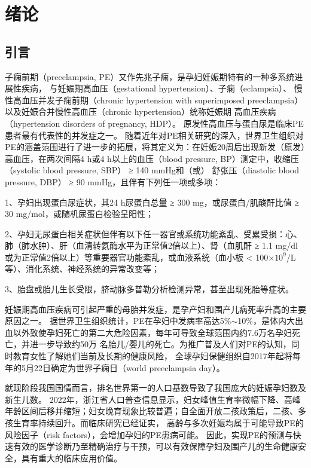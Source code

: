 \chapter{绪论}

\section{引言}
子痫前期（preeclampsia, PE）又作先兆子痫，是孕妇妊娠期特有的一种多系统进展性疾病， 与妊娠期高血压（gestational hypertension）、子痫（eclampsia）、
慢性高血压并发子痫前期（chronic hypertension with superimposed preeclampsia）以及妊娠合并慢性高血压（chronic hypertension）统称妊娠期
高血压疾病（hypertension disorders of pregnancy, HDP）\cite{OAG9,HDASOM,2000s1}。
原发性高血压与蛋白尿是临床PE患者最有代表性的并发症之一。
随着近年对PE相关研究的深入，世界卫生组织对PE的涵盖范围进行了进一步的拓展，将其定义为：在妊娠20周后出现新发（原发）高血压，在两次间隔4 h或4 h以上的血压（blood pressure, BP）测定中，收缩压（systolic blood pressure, SBP） ≥ 140 mmHg和（或）
舒张压（diastolic blood pressure, DBP） ≥ 90 mmHg，且伴有下列任一项或多项\cite{OAG9,FIGO}：

1、孕妇出现蛋白尿症状，其24 h尿蛋白总量 ≥ 300 mg，或尿蛋白/肌酸酐比值 ≥ 30 mg/mol，或随机尿蛋白检验呈阳性；

2、孕妇无尿蛋白相关症状但伴有以下任一器官或系统功能紊乱、受累受损：心、肺（肺水肿）、肝（血清转氨酶水平为正常值2倍以上）、肾（血肌酐 ≥ 1.1 mg/dl
或为正常值2倍以上）等重要器官功能紊乱，或血液系统（血小板 < 100$\times 10^{9}$/L等）、消化系统、神经系统的异常改变等；

3、胎盘或胎儿生长受限，脐动脉多普勒分析检测异常，甚至出现死胎等症状。

妊娠期高血压疾病可引起严重的母胎并发症，是孕产妇和围产儿病死率升高的主要原因之一\cite{OAG9}。
据世界卫生组织统计，PE在孕妇中发病率高达5\%$ \sim $10\%，是体内大出血以外致使孕妇死亡的第二大危险因素，每年可导致全球范围内约7.6万名孕妇死亡，并进一步导致约50万
名胎儿/婴儿的死亡\cite{DAM2015,LCT2006}。为推广普及人们对PE的认知，同时教育女性了解她们当前及长期的健康风险，
全球孕妇保健组织自2017年起将每年的5月22日确定为世界子痫日（world preeclampsia day）。

就现阶段我国国情而言，排名世界第一的人口基数导致了我国庞大的妊娠孕妇数及新生儿数\cite{nbs2022}。
2022年，浙江省人口普查信息显示，妇女峰值生育率微幅下降、高峰年龄区间后移并缩短；妇女晚育现象比较普遍；自全面开放二孩政策后，二孩、多孩生育率持续回升\cite{zjtjj2022}。而临床研究已经证实，
高龄与多次妊娠均属于可能导致PE的风险因子（risk factors），会增加孕妇的PE患病可能\cite{Duckitt2005,FIGO,Yogev2010,Poon2010,Lee2000,Coonrod1995,Robillard1993}。
因此，实现PE的预测与快速有效的医学诊断乃至精确治疗与干预，可以有效保障孕妇及围产儿的生命健康安全，具有重大的临床应用价值。
